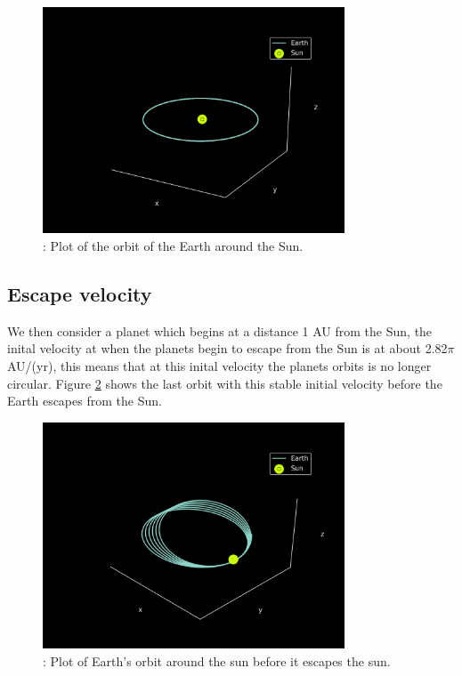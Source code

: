 \documentclass{article}
\begin{document}
\begin{figure}[H]
    \begin{center}
        \includegraphics[width=0.8\textwidth]{./Plot/Earth_orbit.png}
        \caption{: Plot of the orbit of the Earth around the Sun.}
        \label{fig:earth_orbit}
    \end{center}
\end{figure}

\subsection{Escape velocity}
We then consider a planet which begins at a distance 1 AU from the Sun, the inital velocity at when the planets begin to escape from the Sun is at about 2.82$\pi$ AU/(yr), this means that at this inital velocity the planets orbits is no longer circular. Figure \ref{fig:last} shows the last orbit with this stable initial velocity before the Earth escapes from the Sun.

\begin{figure}[H]
    \begin{center}
        \includegraphics[width=0.8\textwidth]{./Plot/last_stable_orbit.png}
        \caption{: Plot of Earth's orbit around the sun before it escapes the sun.}
        \label{fig:last}
    \end{center}
\end{figure}
\end{document}
